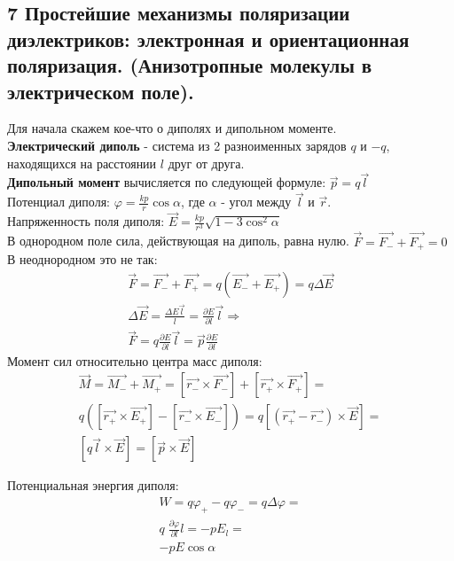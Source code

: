 \documentclass[a4paper,12pt]{article}
\begin{document}
\subsection{7   Простейшие механизмы поляризации диэлектриков: электронная и ориентационная поляризация. (Анизотропные молекулы в электрическом поле).}
Для начала скажем кое-что о диполях и дипольном моменте. \\
\textbf{Электрический диполь} - система из 2 разноименных зарядов $ q $ и $ -q $, находящихся на расстоянии $ l $ друг от друга. \\
\textbf{Дипольный момент} вычисляется по следующей формуле: $\vec{p} = q \vec{l}$\\
Потенциал диполя: $\varphi = \frac {k p} {r} \cos {\alpha}$, где $ \alpha $ - угол между $ \vec{l} $ и $ \vec{r} $. \\
Напряженность поля диполя: $\vec{E} = \frac {k p} {r^3} \sqrt {1 - 3 \cos^2 {\alpha}}$\\
В однородном поле сила, действующая на диполь, равна нулю. $\vec{F} = \vec{F_-} + \vec{F_+} = 0$\\
В неоднородном это не так:
\begin{equation}
\begin{gathered}
	\vec{F} = \vec{F_-} + \vec{F_+} = q (\vec{E_-} + \vec{E_+}) = q \Delta \vec{E} \\
	\Delta \vec{E} = \frac {\Delta E \vec{l}}{l} = \frac {\partial E} {\partial l} \vec{l} \Rightarrow \\
	\vec{F} = q \frac {\partial E} {\partial l} \vec{l} = \vec{p} \frac {\partial E} {\partial l}
\end{gathered}
\end{equation}
Момент сил относительно центра масс диполя:
\begin{equation}
\begin{gathered}
	\vec{M} = \vec{M_-} + \vec{M_+} = [\vec{r_-} \times \vec{F_-}] + [\vec{r_+} \times \vec{F_+}] = \\
	q ([\vec{r_+} \times \vec{E_+}] - [\vec{r_-} \times \vec{E_-}]) = q [(\vec{r_+} - \vec{r_-}) \times \vec{E}] = \\
	[q \vec{l} \times \vec{E}] = [\vec{p} \times \vec{E}]
\end{gathered}
\end{equation}

Потенциальная энергия диполя: 
\begin{equation}
\begin{gathered}
	W = q \varphi_+ - q \varphi_- = q \Delta \varphi = \\
	q \; \frac{\partial \varphi}{\partial l} l = -p E_l = \\
	-p E \cos {\alpha}
\end{gathered}
\end{equation}
\end{document}

